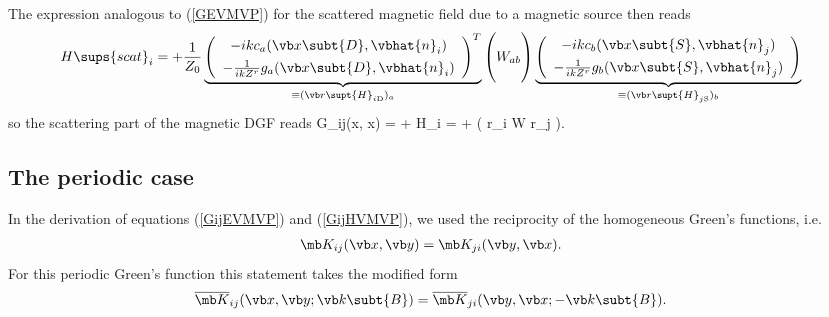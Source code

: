 \documentclass[letterpaper]{article}
\newcommand{\iD}{_{i\text{\tiny D}}}
\newcommand{\jS}{_{j\text{\tiny S}}}
\begin{document}
The expression analogous to (\ref{GEVMVP}) for the scattered
magnetic field due to a magnetic source then reads
\begin{align*}
 H\sups{scat}_i
&=+\frac{1}{Z_0}
  \underbrace{
  \left(\begin{array}{c} 
   -ik c_a(\vb x\subt{D}, \vbhat{n}_i)  \\[4pt]
   -\frac{1}{ik Z^r}  g_a(\vb x\subt{D}, \vbhat{n}_i)
  \end{array}\right)^T
             }_{\equiv (\vb r\supt{H}\iD)_a}
  \left(
 \vphantom{
  \left\{\begin{array}{c} 
     g_a(\vb x\subt{D}, \vbhat{n}_i) \\[4pt]
    -c_a(\vb x\subt{D}, \vbhat{n}_i) 
  \end{array}\right\}^T
          }
         W_{ab}
  \right)
  \underbrace{
  \left(\begin{array}{c} 
   -ik  c_b(\vb x\subt{S}, \vbhat{n}_j)  \\[4pt]
   -\frac{1}{ik Z^r} g_b(\vb x\subt{S}, \vbhat{n}_j)
  \end{array}\right)
             }_{\equiv (\vb r\supt{H}\jS)_b}
\end{align*}
so the scattering part of the magnetic DGF reads
{
 \mc G_{ij}(\vb x, \vb x)
= + H_i
= +
   \Big( \vb r\iD{} \cdot \vb W \cdot \vb r\jS{} \Big).
}

\subsection{The periodic case}

In the derivation of equations (\ref{GijEVMVP}) 
and (\ref{GijHVMVP}), we used the reciprocity of the 
homogeneous Green's functions, i.e.
\begin{align*}
 \mb K_{ij}(\vb x, \vb y) &= \mb K_{ji}(\vb y, \vb x).
\end{align*}
For this periodic Green's function this statement takes the 
modified form
\begin{align*}
 \overline{\mb K}_{ij}(\vb x, \vb y; \vb k\subt{B}) 
 &= \overline{\mb K}_{ji}(\vb y, \vb x; -\vb k\subt{B}).
\end{align*}
\end{document}
